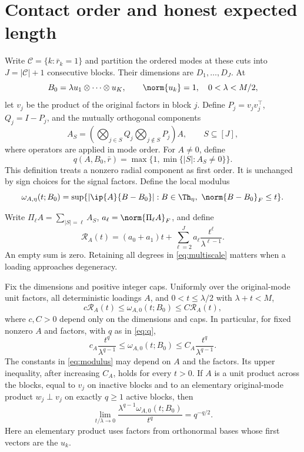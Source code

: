 \section{Contact order and honest expected length}\label{sec:theory}
Write $\mathcal C=\{k:\bar r_k=1\}$ and partition the ordered modes at these cuts into $J=|\mathcal C|+1$ consecutive blocks. Their dimensions are $D_1,\ldots,D_J$. At
\[
 B_0=\lambda u_1\otimes\cdots\otimes u_K,
 \qquad \norm{u_k}=1,\quad 0<\lambda<M/2,
\]
let $v_j$ be the product of the original factors in block $j$. Define $P_j=v_jv_j^\top$, $Q_j=I-P_j$, and the mutually orthogonal components
\[
 A_S=\left(\bigotimes_{j\in S}Q_j\bigotimes_{j\notin S}P_j\right)A,
 \qquad S\subseteq[J],
\]
where operators are applied in mode order. For $A\ne0$, define
\begin{equation}\label{eq:q}
 q(A,B_0,\bar r)=\max\{1,\min\{|S|:A_S\ne0\}\}.
\end{equation}
This definition treats a nonzero radial component as first order. It is unchanged by sign choices for the signal factors. Define the local modulus
\[
 \omega_{A,\eta}(t;B_0)=\sup\{|\ip{A}{B-B_0}|:B\in\Th_\eta,\ \norm{B-B_0}_F\le t\}.
\]

Write $\Pi_\ell A=\sum_{|S|=\ell}A_S$, $a_\ell=\norm{\Pi_\ell A}_F$, and define
\begin{equation}\label{eq:multiscale}
 \mathcal R_A(t)=(a_0+a_1)t+\sum_{\ell=2}^J a_\ell\frac{t^\ell}{\lambda^{\ell-1}}.
\end{equation}
An empty sum is zero. Retaining all degrees in \eqref{eq:multiscale} matters when a loading approaches degeneracy.

\begin{theorem}\label{thm:contact}
Fix the dimensions and positive integer caps. Uniformly over the original-mode unit factors, all deterministic loadings $A$, and $0<t\le\lambda/2$ with $\lambda+t<M$,
\[
 c\mathcal R_A(t)\le\omega_{A,0}(t;B_0)\le C\mathcal R_A(t),
\]
where $c,C>0$ depend only on the dimensions and caps. In particular, for fixed nonzero $A$ and factors, with $q$ as in \eqref{eq:q},
\begin{equation}\label{eq:modulus}
 c_A\frac{t^q}{\lambda^{q-1}}\le\omega_{A,0}(t;B_0)
 \le C_A\frac{t^q}{\lambda^{q-1}}.
\end{equation}
The constants in \eqref{eq:modulus} may depend on $A$ and the factors. Its upper inequality, after increasing $C_A$, holds for every $t>0$. If $A$ is a unit product across the blocks, equal to $v_j$ on inactive blocks and to an elementary original-mode product $w_j\perp v_j$ on exactly $q\ge1$ active blocks, then
\begin{equation}\label{eq:sharpconstant}
 \lim_{t/\lambda\to0}\frac{\lambda^{q-1}\omega_{A,0}(t;B_0)}{t^q}
 =q^{-q/2}.
\end{equation}
Here an elementary product uses factors from orthonormal bases whose first vectors are the $u_k$.
\end{theorem}

